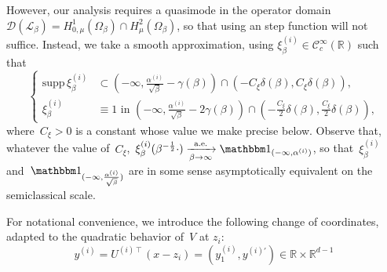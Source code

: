 \documentclass[10pt]{article}
\newcommand{\cL}{\mathcal{L}}
\newcommand{\R}{\mathbb{R}}
\newcommand{\1}{\mathbbm 1}
\newcommand{\supp}{\mathrm{supp}}
\newcommand{\largeRadius}{\delta}
\newcommand{\smallRadius}{\gamma}
\newcommand{\epsLimit}[1]{\alpha^{(#1)}} %
\newcommand{\hessPassage}[2][]{U^{(#2)#1}} %
\newcommand{\fineCutoff}[1]{\xi_\beta^{(#1)}}
\newcommand{\gaussianCutoffConst}{C_\xi}
\begin{document}
            However, our analysis requires a quasimode in the operator domain~${\mathcal D(\cL_\beta) = H_{0,\mu}^1(\Omega_\beta)\cap H^2_\mu(\Omega_\beta)}$, so that using an step function will not suffice. Instead, we take a smooth approximation, using $\xi_\beta^{(i)}\in \mathcal C^\infty_c(\R)$ such that
            \begin{equation}
                \label{eq:gaussian_conditional_cutoff}
                \left\{\begin{aligned}
                \supp\,\fineCutoff{i} &\subset \left(-\infty,\frac{\epsLimit{i}}{\sqrt\beta}-\smallRadius(\beta)\right)\cap \left(-\gaussianCutoffConst\largeRadius(\beta),\gaussianCutoffConst\largeRadius(\beta)\right),\\
                \fineCutoff{i} &\equiv 1\text{ in }\left(-\infty,\frac{\epsLimit{i}}{\sqrt\beta}-2\smallRadius(\beta)\right)\cap \left(-\frac{\gaussianCutoffConst}2\largeRadius(\beta),\frac{\gaussianCutoffConst}2\largeRadius(\beta)\right),
                \end{aligned}\right.
            \end{equation}
            where~$\gaussianCutoffConst>0$ is a constant whose value we make precise below.
            Observe that, whatever the value of~$\gaussianCutoffConst$,~${\fineCutoff{i}(\beta^{-\frac12}\cdot) \xrightarrow[\beta\to\infty]{\text{a.e.}}\1_{(-\infty,\epsLimit{i})}}$, so that~$\fineCutoff{i}$ and~$\1_{(-\infty,\frac{\epsLimit{i}}{\sqrt\beta})}$ are in some sense asymptotically equivalent on the semiclassical scale.

            For notational convenience, we introduce the following change of coordinates, adapted to the quadratic behavior of~$V$ at $z_i$:
            \begin{equation}
                \label{eq:local_coordinates}
                y^{(i)} = \hessPassage[\intercal]{i}(x-z_i) = \left(y_1^{(i)},y^{(i)\prime}\right) \in \R \times \R^{d-1}
            \end{equation}
\end{document}
